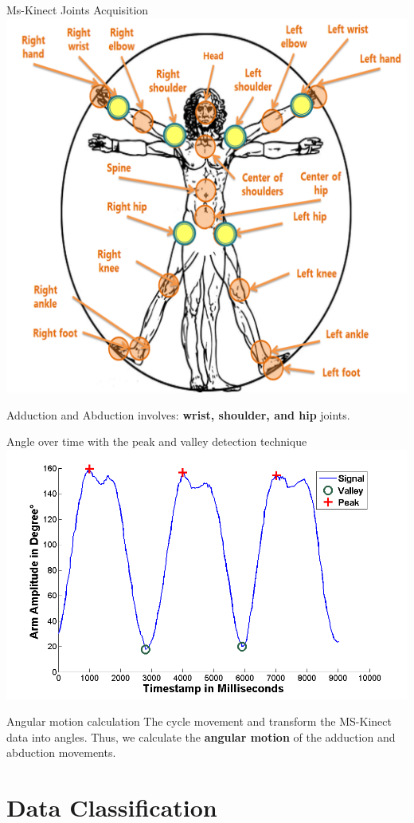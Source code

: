 \documentclass{beamer}
\begin{document}
\begin{frame}{}
  \begin{block}{Ms-Kinect Joints Acquisition}
      \center \includegraphics[height=2.5 in]{img/articulacoes-sel.png}
  \end{block}
	
	\begin{block}{}
	Adduction and Abduction involves: \textbf{wrist, shoulder, and hip} joints.
	\end{block}	
\end{frame}



\begin{frame}{}
  \begin{block}{Angle over time with the peak and valley detection technique}
      \center 
      \includegraphics[height=1.6 in]{img/signalamplitudepeakvaley-2.png}
  \end{block}
	
	\begin{block}{Angular motion calculation}
	The cycle movement and transform the MS-Kinect data into angles. Thus, we calculate the \textbf{angular motion} of the adduction and abduction movements.
	\end{block}
\end{frame}

\section{Data Classification}
%
%
\end{document}
